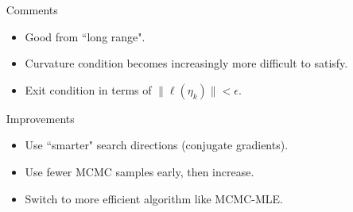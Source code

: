 \documentclass[ 10pt]{beamer}
\begin{document}
{\begin{columns}[]
\begin{column}[T]{0.55\textwidth}
{\begin{table}
\begin{center}
\begin{tabular}{rrrrrrr}
   \hline
\end{tabular}
\end{center}
\end{table}
}
\end{column}
\begin{column}[T]{0.5\textwidth}
\pause
{\small
Comments
\begin{itemize}
\item Good from ``long range".
\item Curvature condition becomes increasingly more difficult to satisfy.
\item Exit condition in terms of $\lVert \ell (\eta_k) \rVert < \epsilon.$  
\end{itemize}
\vspace{2mm}
\pause

Improvements
\begin{itemize}
\item Use ``smarter" search directions (conjugate gradients).
\item Use fewer MCMC samples early, then increase.
\item Switch to more efficient algorithm like MCMC-MLE.  
\end{itemize}
}

\end{column}
\end{columns}
}





\end{document}
